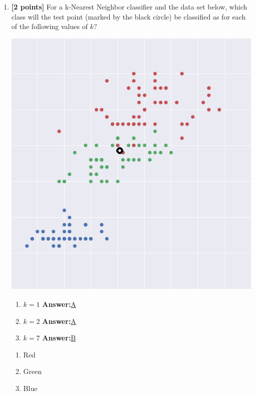 \begin{enumerate}
	\item {\textbf{[2 points]} For a k-Nearest Neighbor classifier and the data set below, which class will the test point (marked by the black circle) be  classified as for each of the following values of $k$? \\
	\begin{minipage}[!ht]{0.5\textwidth}
			\centering
			\includegraphics[width=1.0\textwidth]{knn_test_point.png}
			\label{fig:knn_test_point}
		\end{minipage}
	\begin{minipage}[!ht]{0.25\textwidth}
		\begin{enumerate}[label=(\roman*)]
			\item $k = 1$ \textbf{Answer:}\underline{A}
			\item $k = 2$ \textbf{Answer:}\underline{A}
			\item $k = 7$ \textbf{Answer:}\underline{B}
		\end{enumerate}
	\end{minipage}
	\begin{minipage}[!ht]{0.25\textwidth}
		\begin{enumerate}[label=\Alph*)]
			\item Red
			\item Green
			\item Blue
		\end{enumerate}
	\end{minipage}
	}
	

\end{enumerate}
